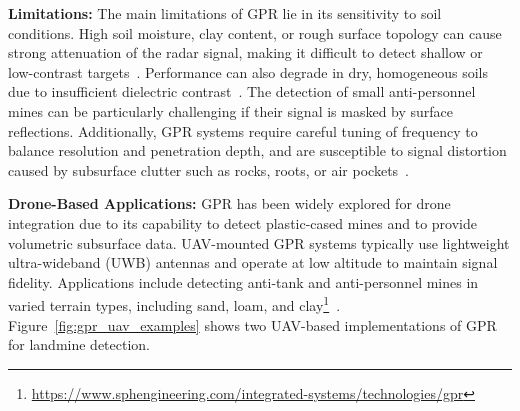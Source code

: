 \textbf{Limitations:} The main limitations of GPR lie in its sensitivity to soil conditions. High soil moisture, clay content, or rough surface topology can cause strong attenuation of the radar signal, making it difficult to detect shallow or low-contrast targets~\cite{Gooneratne2004ARO}. Performance can also degrade in dry, homogeneous soils due to insufficient dielectric contrast~\cite{robledo2009survey}. The detection of small anti-personnel mines can be particularly challenging if their signal is masked by surface reflections. Additionally, GPR systems require careful tuning of frequency to balance resolution and penetration depth, and are susceptible to signal distortion caused by subsurface clutter such as rocks, roots, or air pockets~\cite{cardonalandmine}.

\textbf{Drone-Based Applications:} GPR has been widely explored for drone integration due to its capability to detect plastic-cased mines and to provide volumetric subsurface data. UAV-mounted GPR systems typically use lightweight ultra-wideband (UWB) antennas and operate at low altitude to maintain signal fidelity. Applications include detecting anti-tank and anti-personnel mines in varied terrain types, including sand, loam, and clay\footnote{\url{https://www.sphengineering.com/integrated-systems/technologies/gpr}}~\cite{vsipovs2020lightweight,cerquera2017uav,fernandez2018synthetic,amiri2012feasibility,safarov2022detection,vsipovs2020lightweight,colorado2017integrated,schreiber2019advanced,pongrac2022advanced,garcia2020airborne,prager2019application,garcia2019autonomous,burr2018design,fernandez2021development,colorado2017low,lee2023modeling,sipos2017drone,garcia2022safedrone,almutiry2020uav,schartel2018uav,bahnemann2022under,garcia2022validation,chen2023ground}. Figure~\ref{fig:gpr_uav_examples} shows two UAV-based implementations of GPR for landmine detection.

